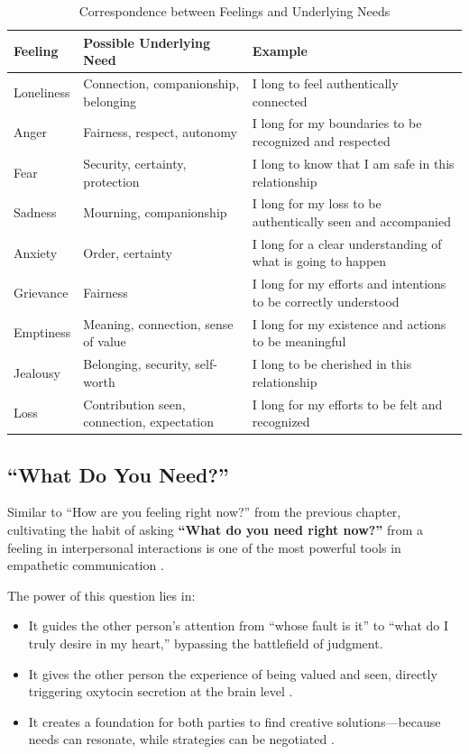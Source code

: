 \begin{table}[h]
\centering
\caption{Correspondence between Feelings and Underlying Needs}
\label{tab:feeling_to_need}
\begin{tabular}{|l|p{5cm}|p{7cm}|}
\hline
\textbf{Feeling} & \textbf{Possible Underlying Need} & \textbf{Example} \\ \hline
Loneliness & Connection, companionship, belonging & I long to feel authentically connected \\ \hline
Anger & Fairness, respect, autonomy & I long for my boundaries to be recognized and respected \\ \hline
Fear & Security, certainty, protection & I long to know that I am safe in this relationship \\ \hline
Sadness & Mourning, companionship & I long for my loss to be authentically seen and accompanied \\ \hline
Anxiety & Order, certainty & I long for a clear understanding of what is going to happen \\ \hline
Grievance & Fairness & I long for my efforts and intentions to be correctly understood \\ \hline
Emptiness & Meaning, connection, sense of value & I long for my existence and actions to be meaningful \\ \hline
Jealousy & Belonging, security, self-worth & I long to be cherished in this relationship \\ \hline
Loss & Contribution seen, connection, expectation & I long for my efforts to be felt and recognized \\ \hline
\end{tabular}
\end{table}

\subsection{``What Do You Need?''}

Similar to ``How are you feeling right now?'' from the previous chapter,
cultivating the habit of asking \textbf{``What do you need right now?''}
from a feeling in interpersonal interactions is one of the most powerful
tools in empathetic communication \citep{lobue2022}.

The power of this question lies in:
\begin{itemize}
    \item It guides the other person's attention from ``whose fault is it''
    to ``what do I truly desire in my heart,'' bypassing the battlefield of
    judgment.
    \item It gives the other person the experience of being valued and seen,
    directly triggering oxytocin secretion at the brain level \citep{christou2025}.
    \item It creates a foundation for both parties to find creative
    solutions---because needs can resonate, while strategies can be
    negotiated \citep{ruba2020}.
\end{itemize}

